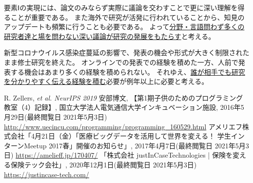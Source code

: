要素Ⅰの実現には、論文のみならず実際に議論を交わすことで更に深い理解を得ることが重要である。
また海外で研究が活発に行われていることから、知見のアップデートも頻繁に行うことも必要である。
よって\underline{分野・言語問わず多くの研究者達と場を問わない深い議論が研究の発展をもたらす}と考える。

新型コロナウイルス感染症蔓延の影響で、発表の機会や形式が大きく制限されたまま修士研究を終えた。
オンラインでの発表での経験を積めた一方、人前で発表する機会はあまり多くの経験を積められない。
それゆえ、\underline{誰が相手でも研究を分かりやすく伝える経験を積む}必要が例年以上に必要と考える。

{\footnotesize
	\begin{thebibliography}{99}
		\setcounter{enumiv}{13}
		 R. Zellers, \textit{et al. NeurIPS 2019}
         安部博文, 【第1期子供のためのプログラミング教室（4）記録】, 国立大学法人電気通信大学インキュベーション施設, 2016年5月29日(最終閲覧日 2021年5月3日) \url{http://www.uecincu.com/programming/programming_160529.html}
         アメリエフ株式会社「4月21日（金）「医療ビッグデータを活用して世界を変える！ 学生インターンMeetup 2017春」開催のお知らせ」, 2017年4月7日(最終閲覧日 2021年5月3日) \url{https://amelieff.jp/170407/}
         「株式会社 justInCaseTechnologies | 保険を変える保険テック会社」, 2020年12月1日(最終閲覧日 2021年5月3日) \url{https://justincase-tech.com/}
	\end{thebibliography}
}


